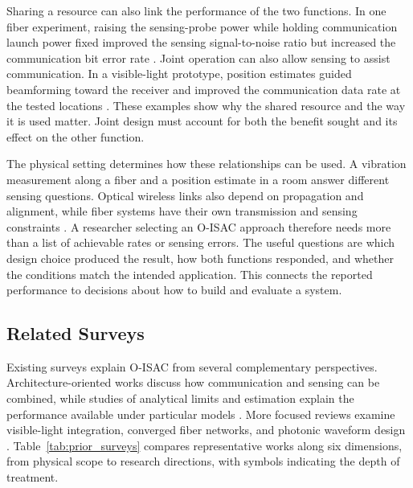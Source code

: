 Sharing a resource can also link the performance of the two functions.
In one fiber experiment, raising the sensing-probe power while holding
communication launch power fixed improved the sensing signal-to-noise ratio
but increased the communication bit error rate \cite{OISAC_SCR00057}.
Joint operation can also allow sensing to assist communication. In a
visible-light prototype, position estimates guided beamforming toward the
receiver and improved the communication data rate at the tested locations
\cite{OISAC_SCR00196}. These examples show why the shared resource and the way
it is used matter. Joint design must account for both the benefit sought and
its effect on the other function.

The physical setting determines how these relationships can be used.
A vibration measurement along a fiber and a position estimate in a room
answer different sensing questions. Optical wireless links also depend on
propagation and alignment, while fiber systems have their own transmission
and sensing constraints \cite{OISAC_SCR00916,OISAC_SCR01085,Mohsan2026OISACReview}.
A researcher selecting an O-ISAC approach therefore needs more than a list
of achievable rates or sensing errors. The useful questions are which design
choice produced the result, how both functions responded, and whether the
conditions match the intended application. This connects the reported
performance to decisions about how to build and evaluate a system.

\subsection{Related Surveys}
\label{sec:related_surveys}

Existing surveys explain O-ISAC from several complementary perspectives.
Architecture-oriented works discuss how communication and sensing can be
combined, while studies of analytical limits and estimation explain the
performance available under particular models
\cite{Wen2024OISACArchitectures,Su2025OISACTheoryPractice,
Khorasgani2026GeneralOpticalISACSurvey}. More focused reviews examine
visible-light integration, converged fiber networks, and photonic waveform
design \cite{Liang2024LiSACReview,Liu2026OpticalFiberISACReview,
Lu2026ConvergedFiberISACReview,Lyu2026PhotonicTHzWaveforms}.
Table~\ref{tab:prior_surveys} compares representative works along six dimensions,
from physical scope to research directions, with symbols indicating the depth
of treatment.

